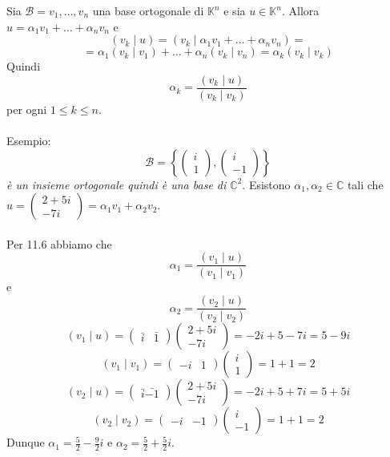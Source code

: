 \documentclass[12pt]{article}
\begin{document}
Sia $\mathcal{B} = {v_1, \dots, v_n}$ una base ortogonale di $\mathbb{K}^n$ e sia $u \in \mathbb{K}^n$. Allora $u = \alpha_1v_1 + \dots + \alpha_nv_n$ e
\[(v_k \mid u) = (v_k \mid \alpha_1v_1 + \dots + \alpha_nv_n) = \]
\[= \alpha_1(v_k \mid v_1) + \dots + \alpha_n(v_k \mid v_n) = \alpha_k(v_k \mid v_k)\]
Quindi
\[\alpha_k = \frac{(v_k \mid u)}{(v_k \mid v_k)}\]
per ogni $1 \le k \le n$.\\\\
Esempio:
\[\mathcal{B} = \left\{\begin{pmatrix}
    i\\
    1
\end{pmatrix}, \begin{pmatrix}
    i\\
    -1
\end{pmatrix}\right\}\]
\textit{è un insieme ortogonale quindi è una base di $\mathbb{C}^2$}. Esistono $\alpha_1, \alpha_2 \in \mathbb{C}$ tali che $u  = \begin{pmatrix}
    2+5i\\
    -7i
\end{pmatrix} = \alpha_1 v_1 + \alpha_2 v_2$.\\\\
Per 11.6 abbiamo che \[\alpha_1 = \frac{(v_1 \mid u)}{(v_1 \mid v_1)}\] e
\[\alpha_2 = \frac{(v_2 \mid u)}{(v_2 \mid v_2)}\]
\[(v_1 \mid u) = \begin{pmatrix}
    \bar{i} & \bar{1}
\end{pmatrix} \begin{pmatrix}
    2+5i\\
    -7i
\end{pmatrix} = -2i + 5 - 7i = 5 - 9i\]
\[(v_1 \mid v_1) = \begin{pmatrix}
    -i & 1
\end{pmatrix} \begin{pmatrix}
    i\\
    1
\end{pmatrix} = 1 + 1 = 2\]
\[(v_2 \mid u) = \begin{pmatrix}
    \bar{i} \bar{-1}
\end{pmatrix} \begin{pmatrix}
    2+5i\\
    -7i
\end{pmatrix} = -2i + 5 + 7i = 5 + 5i\]
\[(v_2 \mid v_2) = \begin{pmatrix}
    -i & -1
\end{pmatrix}\begin{pmatrix}
    i\\
    -1
\end{pmatrix} = 1 + 1 = 2\]
Dunque $\alpha_1 = \frac{5}{2} - \frac{9}{2}i$ e $\alpha_2 = \frac{5}{2} + \frac{5}{2}i$.
\end{document}
